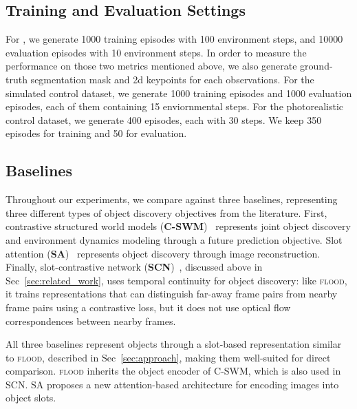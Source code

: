 \documentclass{article}
\begin{document}
\subsection{Training and Evaluation Settings}
For , we generate 1000 training episodes with 100 environment steps, and 10000 evaluation episodes with 10 environment steps. In order to measure the performance on those two metrics mentioned above, we also generate ground-truth segmentation mask and 2d keypoints for each observations. 
For the simulated control dataset, we generate 1000 training episodes and 1000 evaluation episodes, each of them containing 15 enviornmental steps.
For the photorealistic control dataset, we generate 400 episodes, each with 30 steps. We keep 350 episodes for training and 50 for evaluation.
\subsection{Baselines}

Throughout our experiments, we compare against three baselines, representing three different types of object discovery objectives from the literature. First, contrastive structured world models (\textbf{C-SWM})~\cite{kipf2019contrastive} represents joint object discovery and environment dynamics modeling through a future prediction objective. Slot attention (\textbf{SA})~\cite{locatello2020object} represents object discovery through image reconstruction. Finally, slot-contrastive network (\textbf{SCN})~\cite{racah2020slot}, discussed above in Sec~\ref{sec:related_work}, uses temporal continuity for object discovery: like \textsc{flood}, it trains representations that can distinguish far-away frame pairs from nearby frame pairs using a contrastive loss, but it does not use optical flow correspondences between nearby frames.

All three baselines represent objects through a slot-based representation similar to \textsc{flood}, described in Sec~\ref{sec:approach}, making them well-suited for direct comparison. \textsc{flood} inherits the object encoder of C-SWM, which is also used in SCN. SA proposes a new attention-based architecture for encoding images into object slots.


\end{document}
